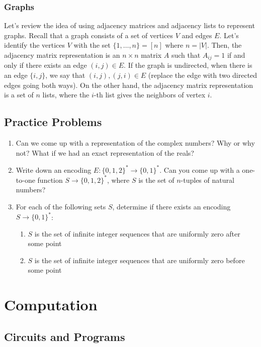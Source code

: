 \documentclass[11pt]{article}
\theoremstyle{definition}
\theoremstyle{remark}
\providecommand{\tightlist}{%
  \setlength{\itemsep}{0pt}\setlength{\parskip}{0pt}}
\begin{document}
\subsubsection{Graphs}
Let's review the idea of using adjacency matrices and adjacency lists to represent graphs. Recall that a graph consists of a set of vertices $V$ and edges $E$. Let's identify the vertices $V$ with the set $\{1, \ldots, n \} = [n]$ where $n = |V|$. Then, the adjacency matrix representation is an $n \times n$ matrix $A$ such that $A_{ij} = 1$ if and only if there exists an edge $(i, j) \in E$. If the graph is undirected, when there is an edge $\{ i, j \}$, we say that $(i,j), (j, i) \in E$ (replace the edge with two directed edges going both ways). On the other hand, the adjacency matrix representation is a set of $n$ lists, where the $i$-th list gives the neighbors of vertex $i$.

\subsection{Practice Problems}
\begin{enumerate}
\tightlist
\item Can we come up with a representation of the complex numbers? Why or why not? What if we had an exact representation of the reals? 
\vspace{0.75in}
\item Write down an encoding $E: \{0,1,2\}^* \to \{0,1\}^*$. Can you come up with a one-to-one function $S \to \{0,1,2\}^*$, where $S$ is the set of $n$-tuples of natural numbers?
\vspace{0.75in}
\item For each of the following sets $S$, determine if there exists an encoding $S \to \{0,1\}^*$:
\begin{enumerate}
    \item $S$ is the set of infinite integer sequences that are uniformly zero after some point
    \item $S$ is the set of infinite integer sequences that are uniformly zero before some point
\end{enumerate} \pagebreak
\end{enumerate}

\section{Computation}

\subsection{Circuits and Programs}
\end{document}
